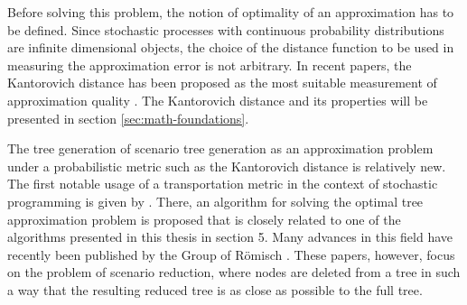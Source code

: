 Before solving this problem, the notion of optimality of an approximation has to be defined. Since stochastic processes with continuous probability distributions are infinite dimensional objects, the choice of the distance function to be used in measuring the approximation error is not arbitrary. In recent papers, the Kantorovich distance has been proposed as the most suitable measurement of approximation quality \cite{Dupacova2003,Heitsch2003,Heitsch2009,Heitsch2009a,Heitsch2010}. The Kantorovich distance and its properties will be presented in section \ref{sec:math-foundations}.

The tree generation of scenario tree generation as an approximation problem under a probabilistic metric such as the Kantorovich distance is relatively new. The first notable usage of a transportation metric in the context of stochastic programming is given by . There, an algorithm for solving the optimal tree approximation problem is proposed that is closely related to one of the algorithms presented in this thesis in section 5. Many advances in this field have recently been published by the Group of R\"{o}misch \cite{Dupacova2003,Heitsch2003,Heitsch2009,Heitsch2009a,Heitsch2010}. These papers, however, focus on the problem of scenario reduction, where nodes are deleted from a tree in such a way that the resulting reduced tree is as close as possible to the full tree.

